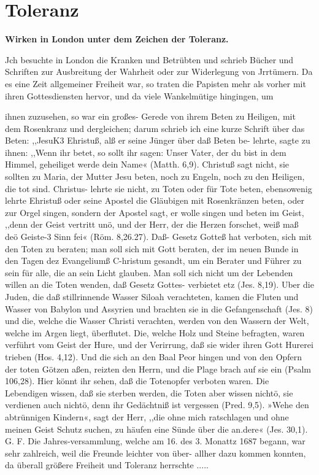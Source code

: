 
\chapter[Toleranz]{Toleranz}

\begin{center}
\textbf{Wirken in London unter dem Zeichen der Toleranz.}
\end{center}


Jch besuchte in London die Kranken und Betrübten und
schrieb Bücher und Schriften zur Ausbreitung der Wahrheit oder
zur Widerlegung von Jrrtümern. Da es eine Zeit allgemeiner
Freiheit war, so traten die Papisten mehr als vorher mit ihren
Gottesdiensten hervor, und da viele Wankelmütige hingingen, um


ihnen zuzusehen, so war ein großes- Gerede von ihrem Beten zu
Heiligen, mit dem Rosenkranz und dergleichen; darum schrieb ich
eine kurze Schrift über das Beten:
,,JesuK3 Ehristuß, alß er seine Jünger über daß Beten be-
lehrte, sagte zu ihnen: ,,Wenn ihr betet, so sollt ihr sagen: Unser
Vater, der du bist in dem Himmel, geheiliget werde dein Name«
(Matth. 6,9). Christuß sagt nicht, sie sollten zu Maria, der
Mutter Jesu beten, noch zu Engeln, noch zu den Heiligen, die
tot sind. Christus- lehrte sie nicht, zu Toten oder für Tote
beten, ebensowenig lehrte Ehristuß oder seine Apostel die Gläubigen
mit Rosenkränzen beten, oder zur Orgel singen, sondern der
Apostel sagt, er wolle singen und beten im Geist, ,,denn der
Geist vertritt unö, und der Herr, der die Herzen forschet, weiß maß
deö Geiste-3 Sinn fei« (Röm. 8,26.27). Daß- Gesetz Gotteß hat
verboten, sich mit den Toten zu beraten; man soll sich mit Gott
beraten, der im neuen Bunde in den Tagen dez Evangeliumß
C-hristum gesandt, um ein Berater und Führer zu sein für alle,
die an sein Licht glauben. Man soll sich nicht um der Lebenden
willen an die Toten wenden, daß Gesetz Gottes- verbietet etz
(Jes. 8,19). Uber die Juden, die daß stillrinnende Wasser Siloah
verachteten, kamen die Fluten und Wasser von Babylon und
Assyrien und brachten sie in die Gefangenschaft (Jes. 8) und die,
welche die Wasser Christi verachten, werden von den Wassern
der Welt, welche im Argen liegt, überflutet. Die, welche Holz
und Steine befragten, waren verführt vom Geist der Hure, und
der Verirrung, daß sie wider ihren Gott Hurerei trieben (Hos. 4,12).
Und die sich an den Baal Peor hingen und von den Opfern der
toten Götzen aßen, reizten den Herrn, und die Plage brach
auf sie ein (Psalm 106,28). Hier könnt ihr sehen, daß die
Totenopfer verboten waren. Die Lebendigen wissen, daß sie
sterben werden, die Toten aber wissen nichtö, sie verdienen auch
nichtö, denn ihr Gedächtniß ist vergessen (Pred. 9,5). »Wehe den
abtrünnigen Kindern«, sagt der Herr, ,,die ohne mich ratschlagen
und ohne meinen Geist Schutz suchen, zu häufen eine Sünde über
die an.dere« (Jes. 30,1). G. F.
Die Jahres-versammlung, welche am 16. des 3. Monattz 1687
begann, war sehr zahlreich, weil die Freunde leichter von über-
allher dazu kommen konnten, da überall größere Freiheit und
Toleranz herrschte .....


